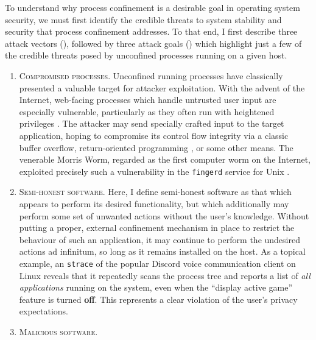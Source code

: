 \documentclass[dvipsnames, 12pt]{article}
\begin{document}
To understand why process confinement is a desirable goal in operating system
security, we must first identify the credible threats to system stability and
security that process confinement addresses. To that end, I first describe three
attack vectors (), followed by three attack goals
() which highlight just a few of the credible threats posed
by unconfined processes running on a given host.

\begin{enumerate}[label=\bfseries A\arabic*., ref=A\arabic*, labelindent=2em]
    \item \label{a:1} \textsc{Compromised processes.} Unconfined running
    processes have classically presented a valuable target for attacker
    exploitation. With the advent of the Internet, web-facing processes which
    handle untrusted user input are especially vulnerable, particularly as they
    often run with heightened privileges . The attacker may send
    specially crafted input to the target application, hoping to compromise its
    control flow integrity via a classic buffer overflow, return-oriented
    programming , or some other means. The venerable Morris Worm,
    regarded as the first computer worm on the Internet, exploited precisely
    such a vulnerability in the \texttt{fingerd} service for Unix .

    \item \label{a:2} \textsc{Semi-honest software.} Here, I define semi-honest
    software as that which appears to perform its desired functionality, but
    which additionally may perform some set of unwanted actions without the
    user's knowledge. Without putting a proper, external confinement mechanism
    in place to restrict the behaviour of such an application, it may continue
    to perform the undesired actions ad infinitum, so long as it remains
    installed on the host. As a topical example, an \texttt{strace} of the
    popular Discord  voice communication client on Linux reveals that
    it repeatedly scans the process tree and reports a list of \textit{all applications}
    running on the system, even when the \enquote{display active game} feature
    is turned \textbf{off}. This represents a clear violation of the user's
    privacy expectations.

    \item \label{a:3} \textsc{Malicious software.} 
\end{enumerate}
\end{document}

